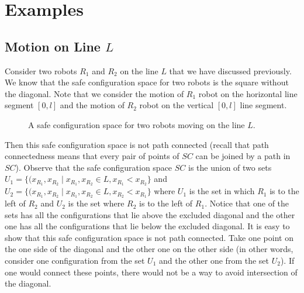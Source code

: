 \documentclass[12pt]{article}
\theoremstyle{definition}
\begin{document}

\section*{\centering Examples}

\subsection*{\centering Motion on Line $L$}

Consider two robots $R_1$ and $R_2$ on the line $L$ that we have discussed previously.
We know that the safe configuration space for two robots is the square without the diagonal.
Note that we consider the motion of $R_1$ robot on the horizontal line segment $[0, l]$
and the motion of $R_2$ robot on the vertical $[0, l]$ line segment.

\begin{figure}[H]
    \centering
    \caption*{A safe configuration space for two robots moving on the line $L$.}
\end{figure}

Then this safe configuration space is not path connected (recall that path connectedness
means that every pair of points of $SC$ can be joined by a path in $SC$). Observe that the safe configuration
space $SC$ is the union of two sets $U_1 = \{(x_{R_1}, x_{R_2} \mid x_{R_1}, x_{R_2} \in L, x_{R_1} < x_{R_2}\}$
and $U_2 = \{(x_{R_1}, x_{R_2} \mid x_{R_1}, x_{R_2} \in L, x_{R_2} < x_{R_1}\}$ where $U_1$ is the set in which $R_1$
is to the left of $R_2$ and $U_2$ is the set where $R_2$ is to the left of $R_1$. Notice that one of the sets has all
the configurations that lie above the excluded diagonal and the other one has all the configurations that lie below the
excluded diagonal. It is easy to show that this safe configuration space is not path connected. Take one point on the
one side of the diagonal and the other one on the other side (in other words, consider one configuration from the set
$U_1$ and the other one from the set $U_2$). If one would connect these points, there would not be a way to avoid
intersection of the diagonal.
\end{document}
